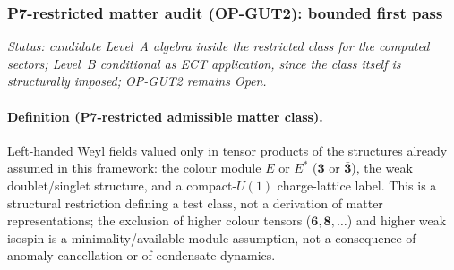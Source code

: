 

\subsubsection*{P7-restricted matter audit (OP-GUT2): bounded
first pass}

\textit{Status: candidate Level~A algebra inside the restricted
class for the computed sectors; Level~B conditional as ECT
application, since the class itself is structurally imposed;
OP-GUT2 remains Open.}

\paragraph{Definition (P7-restricted admissible matter class).}
Left-handed Weyl fields valued only in tensor products of the
structures already assumed in this framework: the colour module
$E$ or $E^*$ ($\mathbf 3$ or $\bar{\mathbf 3}$), the weak
doublet/singlet structure, and a compact-$U(1)$ charge-lattice
label.
This is a structural restriction defining a test class, not a
derivation of matter representations; the exclusion of higher
colour tensors ($\mathbf 6,\mathbf 8,\dots$) and higher weak
isospin is a minimality/available-module assumption, not a
consequence of anomaly cancellation or of condensate dynamics.

